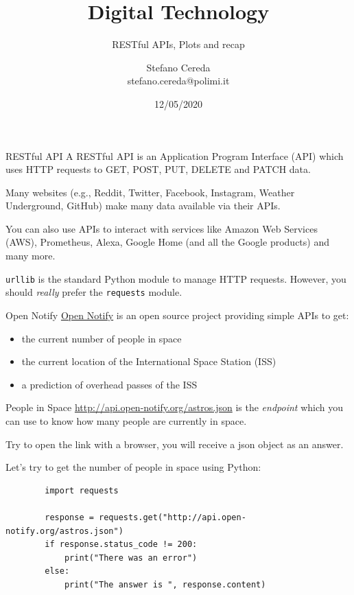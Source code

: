 \documentclass[aspectratio=169,handout]{beamer}
\title{Digital Technology}
\subtitle{RESTful APIs, Plots and recap}
\author{Stefano Cereda\\
stefano.cereda@polimi.it
}
\date{12/05/2020}
\institute[PoliMi]{Politecnico Milano}
\begin{document}
\begin{frame}
    \maketitle
\end{frame}

\begin{frame}{RESTful API}
    A RESTful API is an Application Program Interface (API) which uses HTTP requests to GET, POST, PUT, DELETE and PATCH
    data.

    \pause
    Many websites (e.g., Reddit, Twitter, Facebook, Instagram, Weather Underground, GitHub) make many data available via their APIs.

    You can also use APIs to interact with services like Amazon Web Services (AWS), Prometheus, Alexa, Google Home (and all the
    Google products) and many more.

    \pause
    \texttt{urllib} is the standard Python module to manage HTTP requests.
    However, you should \emph{really} prefer the \texttt{requests} module.
\end{frame}

\begin{frame}{Open Notify}
    \href{http://open-notify.org/}{Open Notify} is an open source project providing simple APIs to get:
    \begin{itemize}
        \item the current number of people in space
        \item the current location of the International Space Station (ISS)
        \item a prediction of overhead passes of the ISS
    \end{itemize}
\end{frame}

\begin{frame}[fragile]{People in Space}
    \url{http://api.open-notify.org/astros.json} is the \emph{endpoint} which you can use to know how many people are
    currently in space.

    Try to open the link with a browser, you will receive a json object as an answer.

    Let's try to get the number of people in space using Python:
    \begin{verbatim}
        import requests

        response = requests.get("http://api.open-notify.org/astros.json")
        if response.status_code != 200:
            print("There was an error")
        else:
            print("The answer is ", response.content)
    \end{verbatim}
\end{frame}
\end{document}
